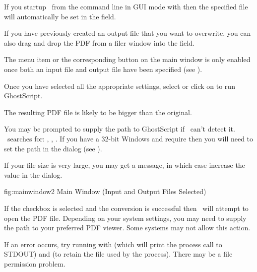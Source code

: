 \begin{information}
If you startup \Jmakepdfx\ from the command line in \gls{GUI} mode
with  then the specified file will automatically be
set in the  field.
\end{information}

If you have previously created an output file that you want to
overwrite, you can also drag and drop the
PDF from a filer window into the  field.

The  menu item or the corresponding button on the
main window is only enabled once both an input file and output file
have been specified (see ). 

Once you have selected all the appropriate settings,
select  or click on 
 to run GhostScript.

\begin{information}
The resulting PDF file is likely to be bigger than the original.
\end{information}

You may be prompted to supply the path to GhostScript if 
\Jmakepdfx\ can't detect it. \Jmakepdfx\ searches for:
, , .
If you have a 32-bit Windows and require 
then you will need to set the path in the  dialog
(see ).

\begin{warning}
If your file size is very large, you may get a
 message, in which case  
increase the
 value in the  dialog.
\end{warning}

\FloatFig
 {fig:mainwindow2}
 {%
 }
 {Main Window (Input and Output Files Selected)}

If the  checkbox is selected and the conversion is
successful then \Jmakepdfx\ will attempt to open the PDF file.
Depending on your system settings, you may need to supply the path
to your preferred PDF viewer. Some systems may not allow this
action.

\begin{information}
If an error occurs, try running  with
 (which will print the process call to STDOUT) 
and  (to retain the file used by the process).
There may be a file permission problem.
\end{information}

